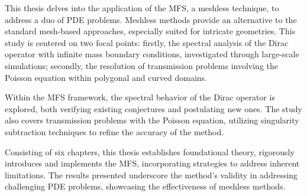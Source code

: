 \acresetall
\noindent
This thesis delves into the application of the \ac{MFS}, a meshless technique, to address a duo of \ac{PDE} problems. Meshless methods provide an alternative to the standard mesh-based approaches, especially suited for intricate geometries. This study is centered on two focal points: firstly, the spectral analysis of the Dirac operator with infinite mass boundary conditions, investigated through large-scale simulations; secondly, the resolution of transmission problems involving the Poisson equation within polygonal and curved domains.

Within the \ac{MFS} framework, the spectral behavior of the Dirac operator is explored, both verifying existing conjectures and postulating new ones. The study also covers transmission problems with the Poisson equation, utilizing singularity subtraction techniques to refine the accuracy of the method.

Consisting of six chapters, this thesis establishes foundational theory, rigorously introduces and implements the \ac{MFS}, incorporating strategies to address inherent limitations. The results presented underscore the method's validity in addressing challenging \ac{PDE} problems, showcasing the effectiveness of meshless methods.